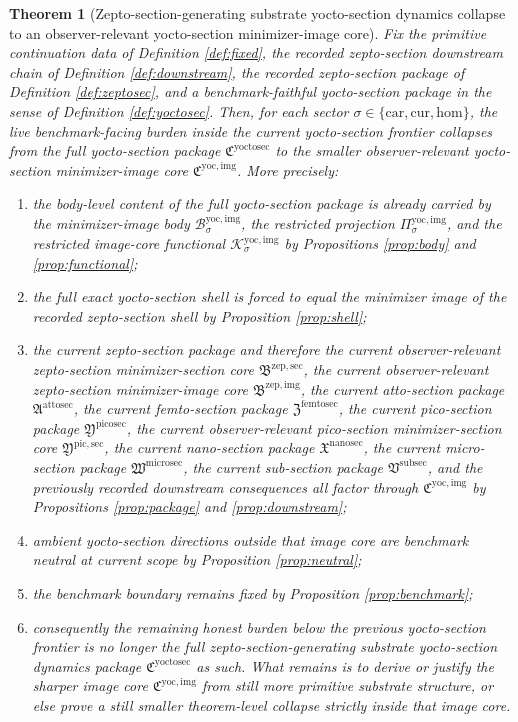 \documentclass[11pt]{article}
\newcommand{\Car}{\mathrm{car}}
\newcommand{\Cur}{\mathrm{cur}}
\newcommand{\Hom}{\mathrm{hom}}
\newcommand{\SubSectionPackage}{\mathfrak V^{\mathrm{subsec}}}
\newcommand{\MicroSectionPackage}{\mathfrak W^{\mathrm{microsec}}}
\newcommand{\NanoSectionPackage}{\mathfrak X^{\mathrm{nanosec}}}
\newcommand{\PicoSectionPackage}{\mathfrak Y^{\mathrm{picosec}}}
\newcommand{\PicoMinSectionCore}{\mathfrak Y^{\mathrm{pic,sec}}}
\newcommand{\FemtoSectionPackage}{\mathfrak Z^{\mathrm{femtosec}}}
\newcommand{\AttoSectionPackage}{\mathfrak A^{\mathrm{attosec}}}
\newcommand{\ZeptoImageCore}{\mathfrak B^{\mathrm{zep,img}}}
\newcommand{\ZeptoMinSectionCore}{\mathfrak B^{\mathrm{zep,sec}}}
\newcommand{\YoctoSectionPackage}{\mathfrak C^{\mathrm{yoctosec}}}
\newcommand{\YoctoImageCore}{\mathfrak C^{\mathrm{yoc,img}}}
\newcommand{\YoctoImgBody}[1]{\mathcal B_{#1}^{\mathrm{yoc,img}}}
\newcommand{\YoctoImgProj}[1]{\Pi_{#1}^{\mathrm{yoc,img}}}
\newcommand{\YoctoImgFunctional}[1]{\mathscr K_{#1}^{\mathrm{yoc,img}}}
\newtheorem{theorem}{Theorem}
\begin{document}
\begin{theorem}[Zepto-section-generating substrate yocto-section dynamics collapse to an observer-relevant yocto-section minimizer-image core]
\label{thm:main}
Fix the primitive continuation data of Definition \ref{def:fixed}, the recorded zepto-section downstream chain of Definition \ref{def:downstream}, the recorded zepto-section package of Definition \ref{def:zeptosec}, and a benchmark-faithful yocto-section package in the sense of Definition \ref{def:yoctosec}. Then, for each sector \(\sigma\in\{\Car,\Cur,\Hom\}\), the live benchmark-facing burden inside the current yocto-section frontier collapses from the full yocto-section package \(\YoctoSectionPackage\) to the smaller observer-relevant yocto-section minimizer-image core \(\YoctoImageCore\). More precisely:
\begin{enumerate}
    \item the body-level content of the full yocto-section package is already carried by the minimizer-image body \(\YoctoImgBody{\sigma}\), the restricted projection \(\YoctoImgProj{\sigma}\), and the restricted image-core functional \(\YoctoImgFunctional{\sigma}\) by Propositions \ref{prop:body} and \ref{prop:functional};
    \item the full exact yocto-section shell is forced to equal the minimizer image of the recorded zepto-section shell by Proposition \ref{prop:shell};
    \item the current zepto-section package and therefore the current observer-relevant zepto-section minimizer-section core \(\ZeptoMinSectionCore\), the current observer-relevant zepto-section minimizer-image core \(\ZeptoImageCore\), the current atto-section package \(\AttoSectionPackage\), the current femto-section package \(\FemtoSectionPackage\), the current pico-section package \(\PicoSectionPackage\), the current observer-relevant pico-section minimizer-section core \(\PicoMinSectionCore\), the current nano-section package \(\NanoSectionPackage\), the current micro-section package \(\MicroSectionPackage\), the current sub-section package \(\SubSectionPackage\), and the previously recorded downstream consequences all factor through \(\YoctoImageCore\) by Propositions \ref{prop:package} and \ref{prop:downstream};
    \item ambient yocto-section directions outside that image core are benchmark neutral at current scope by Proposition \ref{prop:neutral};
    \item the benchmark boundary remains fixed by Proposition \ref{prop:benchmark};
    \item consequently the remaining honest burden below the previous yocto-section frontier is no longer the full zepto-section-generating substrate yocto-section dynamics package \(\YoctoSectionPackage\) as such. What remains is to derive or justify the sharper image core \(\YoctoImageCore\) from still more primitive substrate structure, or else prove a still smaller theorem-level collapse strictly inside that image core.
\end{enumerate}
\end{theorem}
\end{document}
